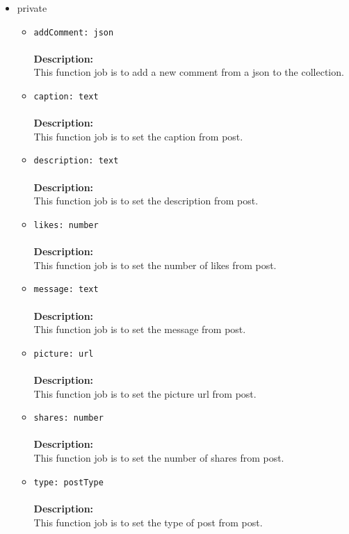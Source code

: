 \begin{itemize}
\begin{itemize}
\begin{itemize}
\item private
\label{sec-1-4-2-4-2-1}%
\begin{itemize}
\item \verb~addComment: json~\\\\
\textbf{Description:}\\
      This function job is to add a new comment from a json to the collection.\\
\item \verb~caption: text~\\\\
\textbf{Description:}\\
      This function job is to set the caption from post.\\
\item \verb~description: text~\\\\
\textbf{Description:}\\
      This function job is to set the description from post.\\
\item \verb~likes: number~\\\\
\textbf{Description:}\\
      This function job is to set the number of likes from post.\\
\item \verb~message: text~\\\\
\textbf{Description:}\\
      This function job is to set the message from post.\\
\item \verb~picture: url~\\\\
\textbf{Description:}\\
      This function job is to set the picture url from post.\\
\item \verb~shares: number~\\\\
\textbf{Description:}\\
      This function job is to set the number of shares from post.\\
\item \verb~type: postType~\\\\
\textbf{Description:}\\
      This function job is to set the type of post from post.
\end{itemize}



\end{itemize}
\end{itemize}
\end{itemize}
